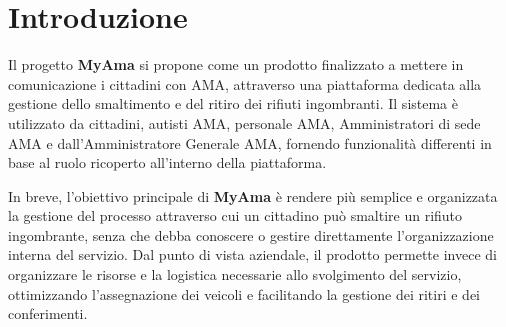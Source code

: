 \section{Introduzione}

Il progetto \textbf{MyAma} si propone come un prodotto finalizzato a mettere in comunicazione i cittadini con AMA, attraverso una piattaforma dedicata alla gestione dello smaltimento e del ritiro dei rifiuti ingombranti. Il sistema è utilizzato da cittadini, autisti AMA, personale AMA, Amministratori di sede AMA e dall'Amministratore Generale AMA, fornendo funzionalità differenti in base al ruolo ricoperto all’interno della piattaforma.

In breve, l’obiettivo principale di \textbf{MyAma} è rendere più semplice e organizzata la gestione del processo attraverso cui un cittadino può smaltire un rifiuto ingombrante, senza che debba conoscere o gestire direttamente l’organizzazione interna del servizio. Dal punto di vista aziendale, il prodotto permette invece di organizzare le risorse e la logistica necessarie allo svolgimento del servizio, ottimizzando l'assegnazione dei veicoli e facilitando la gestione dei ritiri e dei conferimenti.

